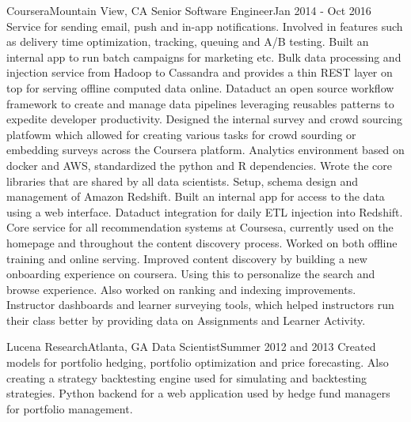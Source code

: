 \documentclass[letterpaper,11pt]{article}
\begin{document}
    \resumeSubheading
      {Coursera}{Mountain View, CA}
      {Senior Software Engineer}{Jan 2014 - Oct 2016}
      \resumeItemListStart
          {Service for sending email, push and in-app notifications. Involved in features such as delivery time optimization, tracking, queuing and A/B testing. Built an internal app to run batch campaigns for marketing etc.}
          {Bulk data processing and injection service from Hadoop to Cassandra and provides a thin REST layer on top for serving offline computed data online.}
          {Dataduct an open source workflow framework to create and manage data pipelines leveraging reusables patterns to expedite developer productivity.}
          {Designed the internal survey and crowd sourcing platfowm which allowed for creating various tasks for crowd sourding or embedding surveys across the Coursera platform.}
          {Analytics environment based on docker and AWS, standardized the python and R dependencies. Wrote the core libraries that are shared by all data scientists.}
          {Setup, schema design and management of Amazon Redshift. Built an internal app for access to the data using a web interface. Dataduct integration for daily ETL injection into Redshift.}
          {Core service for all recommendation systems at Coursesa, currently used on the homepage and throughout the content discovery process. Worked on both offline training and online serving.}
          {Improved content discovery by building a new onboarding experience on coursera. Using this to personalize the search and browse experience. Also worked on ranking and indexing improvements.}
          {Instructor dashboards and learner surveying tools, which helped instructors run their class better by providing data on Assignments and Learner Activity.}
      \resumeItemListEnd

    \resumeSubheading
      {Lucena Research}{Atlanta, GA}
      {Data Scientist}{Summer 2012 and 2013}
      \resumeItemListStart
          {Created models for portfolio hedging,  portfolio optimization and price forecasting. Also creating a strategy backtesting engine used for simulating and backtesting strategies.}
          {Python backend for a web application used by hedge fund managers for portfolio management.}
      \resumeItemListEnd
\end{document}
